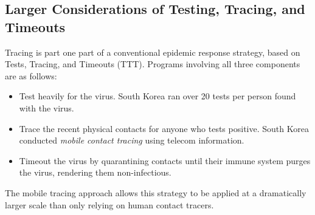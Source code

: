 \documentclass{article}
\begin{document}
\iffalse
\begin{enumerate}
\item All tracing technologies come with risks, benefits, and tradeoffs, including inescapable false positive and false negative rates. The false alerts may not occur evenly but by particular demographic attributes, putting a unfair burdens on specific demographic groups. Accordingly, alerts themselves may also benefit one cross section of society more than another. It is worth noting the current COVID-19 pandemic has placed highly imbalanced risks on essential workers (particularly healthcare workers) compared to non-essential workers in developed nations.
\item The narrowcast broadcasting mechanism permits the local public health departments to provide messages to citizens. The quality of local health departments may vary widely in different regions thereby enabling further imbalances.
\item If adoption occurs, then this creates a different equilibrium in society, where citizens have adopted a new technology which will impact their lives and health. It may not benefit all parties equally.
\item This technology may provide the greatest benefit to those with mobile phones.
\item The protocols outlined here do not explicitly require government regulation or hospital certification. They may also be used with crowd-sourcing or other distributed means. This has implications to lesser developed nations.
\end{enumerate}
\fi


\subsection{Larger Considerations of Testing, Tracing, and Timeouts}
Tracing is part one part of a conventional epidemic response strategy, based on Tests, Tracing, and Timeouts (TTT). Programs involving all three components are as follows:
\begin{itemize}
\item Test heavily for the virus.  South Korea ran over 20 tests per person found with the virus. 
\item Trace the recent physical contacts for anyone who tests positive.  South Korea conducted \emph{mobile contact tracing} using telecom information.
\item Timeout the virus by quarantining contacts until their immune system purges the virus, rendering them non-infectious.
\end{itemize}
The mobile tracing approach allows this strategy to be applied at a dramatically larger scale than only relying on human contact tracers.  
\end{document}
